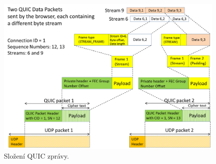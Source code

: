 \begin{figure}[H]
    \centering
    \includegraphics[width=1\linewidth]{quic_zprava.png}
    \caption{Složení QUIC zprávy.}
\end{figure}

